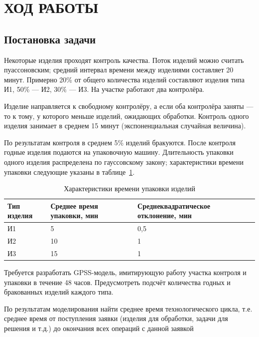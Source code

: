 \section{ХОД РАБОТЫ}

\subsection{Постановка задачи}

Некоторые изделия проходят контроль качества.
Поток изделий можно считать пуассоновским; средний интервал времени
между изделиями составляет 20 минут. 
Примерно 20\% от общего количества изделий составляют изделия типа И1,
50\% --- И2, 30\% --- И3.
На участке работают два контролёра.

Изделие направляется к свободному контролёру, а если оба контролёра заняты
--- то к тому, у которого меньше изделий, ожидающих обработки.
Контроль одного изделия занимает в среднем 15 минут
(экспоненциальная случайная величина).

По результатам контроля в среднем 5\% изделий бракуются. После контроля
годные изделия подаются на упаковочную машину. Длительность упаковки
одного изделия распределена по гауссовскому закону;
характеристики времени упаковки следующие указаны в
таблице~\ref{tbl:source_data}.

\begin{table}[h!]
  \caption{Характеристики времени упаковки изделий}
  \label{tbl:source_data}
  \centering
  \begin{tabular}{| p{} | p{} | p{} |}
    \hline
    Тип изделия &
    Среднее время \newline упаковки, мин &
    Среднеквадратическое \newline отклонение, мин \\
    \hline
    И1 & 5 & 0{,}5 \\
    \hline
    И2 & 10 & 1 \\
    \hline
    И3 & 15 & 1 \\
    \hline
    \end{tabular}
\end{table}

Требуется разработать GPSS-модель, имитирующую работу участка контроля и
упаковки в течение 48 часов.
Предусмотреть подсчёт количества годных и бракованных изделий каждого типа.

По результатам моделирования найти среднее время технологического цикла,
т.е. среднее время от поступления заявки (изделия для обработки, задачи для решения и т.д.)
до окончания всех операций с данной заявкой

